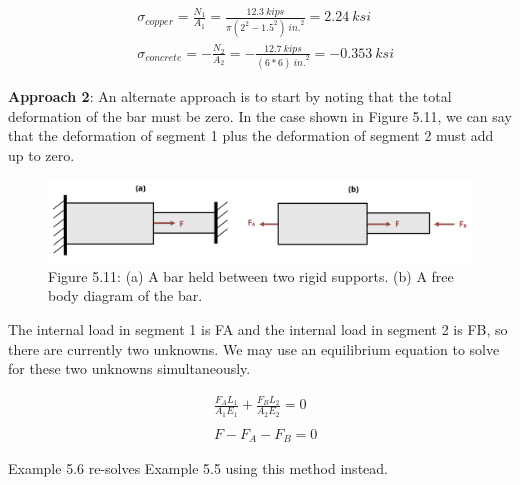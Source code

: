 \documentclass[
  letterpaper,
  DIV=11,
  numbers=noendperiod]{scrreprt}
\theoremstyle{definition}
\theoremstyle{remark}
\begin{document}
\begin{tcolorbox}
\begin{tcolorbox}
\[
\begin{aligned}
& \sigma_{copper}=\frac{N_1}{A_1}=\frac{12.3{~kips}}{\pi(2^2-1.5^2){~in.}^2}=2.24 {~ksi} \\
& \sigma_{concrete}=-\frac{N_2}{A_2}=-\frac{12.7{~kips}}{(6 * 6){~in.}^2}=-0.353 {~ksi}
\end{aligned}
\]

\end{tcolorbox}

\end{tcolorbox}

\textbf{Approach 2}: An alternate approach is to start by noting that
the total deformation of the bar must be zero. In the case shown in
Figure 5.11, we can say that the deformation of segment 1 plus the
deformation of segment 2 must add up to zero.

\begin{figure}[H]

{\centering \includegraphics{images/PNGs/Figure 5.12.png}

}

\caption{Figure 5.11: (a) A bar held between two rigid supports. (b) A
free body diagram of the bar.}

\end{figure}%

The internal load in segment 1 is FA and the internal load in segment 2
is FB, so there are currently two unknowns. We may use an equilibrium
equation to solve for these two unknowns simultaneously.

\[
\begin{aligned} & \frac{F_A L_1}{A_1 E_1}+\frac{F_B L_2}{A_2 E_2}=0 \\
\\
 & F-F_A-F_B=0\end{aligned}\]

Example 5.6 re-solves Example 5.5 using this method instead.
\end{document}
